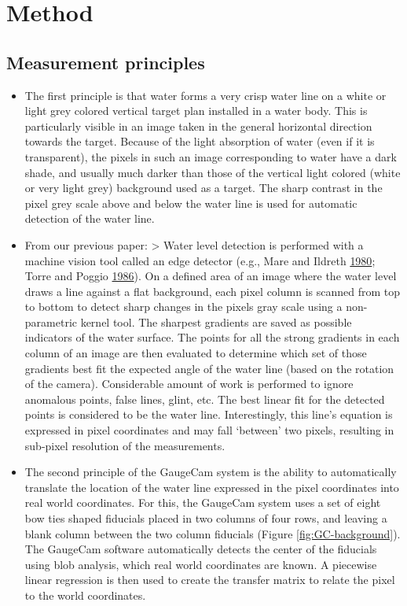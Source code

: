\documentclass[]{article}
\begin{document}
\hypertarget{method}{%
\section{Method}\label{method}}

\hypertarget{measurement-principles}{%
\subsection{Measurement principles}\label{measurement-principles}}

\begin{itemize}
\item
  The first principle is that water forms a very crisp water line on a white or light grey colored vertical target plan installed in a water body. This is particularly visible in an image taken in the general horizontal direction towards the target. Because of the light absorption of water (even if it is transparent), the pixels in such an image corresponding to water have a dark shade, and usually much darker than those of the vertical light colored (white or very light grey) background used as a target. The sharp contrast in the pixel grey scale above and below the water line is used for automatic detection of the water line.
\item
  From our previous paper:
  \textgreater{} Water level detection is performed with a machine vision tool called an edge detector (e.g., Mare and Ildreth \protect\hyperlink{ref-Mare1980-kl}{1980}; Torre and Poggio \protect\hyperlink{ref-Torre1986-ez}{1986}). On a defined area of an image where the water level draws a line against a flat background, each pixel column is scanned from top to bottom to detect sharp changes in the pixels gray scale using a non-parametric kernel tool. The sharpest gradients are saved as possible indicators of the water surface. The points for all the strong gradients in each column of an image are then evaluated to determine which set of those gradients best fit the expected angle of the water line (based on the rotation of the camera). Considerable amount of work is performed to ignore anomalous points,
  false lines, glint, etc. The best linear fit for the detected points is considered to be the water line. Interestingly,
  this line's equation is expressed in pixel coordinates and may fall `between' two pixels, resulting in sub-pixel resolution of the measurements.
\item
  The second principle of the GaugeCam system is the ability to automatically translate the location of the water line expressed in the pixel coordinates into real world coordinates. For this, the GaugeCam system uses a set of eight bow ties shaped fiducials placed in two columns of four rows, and leaving a blank column between the two column fiducials (Figure \ref{fig:GC-background}). The GaugeCam software automatically detects the center of the fiducials using blob analysis, which real world coordinates are known. A piecewise linear regression is then used to create the transfer matrix to relate the pixel to the world coordinates.
\end{itemize}
\end{document}
